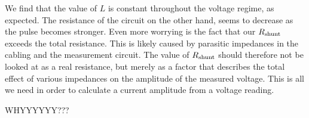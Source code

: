 We find that the value of $L$ is constant throughout the voltage regime, as 
expected. The resistance of the circuit on the other hand, seems to 
decrease as the pulse becomes stronger. Even more worrying is the fact that 
our $R_\mathrm{shunt}$ exceeds the total resistance. This is likely caused by 
parasitic impedances in the cabling and the measurement circuit. The value 
of $R_\mathrm{shunt}$ should therefore not be looked at as a real resistance, but 
merely as a factor that describes the total effect of various impedances on 
the amplitude of the measured voltage. This is all we need in order to 
calculate a current amplitude from a voltage reading.

WHYYYYYY???

